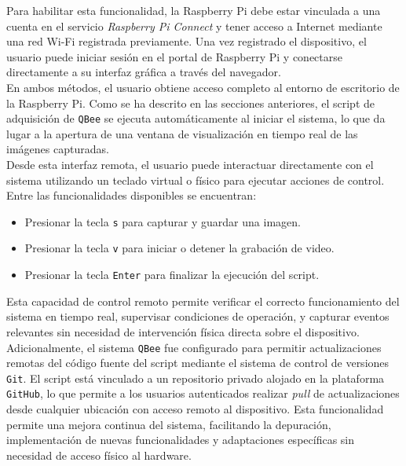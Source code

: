   Para habilitar esta funcionalidad, la Raspberry Pi debe estar vinculada a una cuenta en el servicio \textit{Raspberry Pi Connect} y tener acceso a Internet mediante una red Wi-Fi registrada previamente. Una vez registrado el dispositivo, el usuario puede iniciar sesión en el portal de Raspberry Pi y conectarse directamente a su interfaz gráfica a través del navegador.  \\
  
  
  En ambos métodos, el usuario obtiene acceso completo al entorno de escritorio de la Raspberry Pi. Como se ha descrito en las secciones anteriores, el script de adquisición de \texttt{QBee} se ejecuta automáticamente al iniciar el sistema, lo que da lugar a la apertura de una ventana de visualización en tiempo real de las imágenes capturadas.\\
  
  Desde esta interfaz remota, el usuario puede interactuar directamente con el sistema utilizando un teclado virtual o físico para ejecutar acciones de control. Entre las funcionalidades disponibles se encuentran:
  \begin{itemize}
      \item Presionar la tecla \texttt{s} para capturar y guardar una imagen.
      \item Presionar la tecla \texttt{v} para iniciar o detener la grabación de video.
      \item Presionar la tecla \texttt{Enter} para finalizar la ejecución del script.
  \end{itemize}
  
  Esta capacidad de control remoto permite verificar el correcto funcionamiento del sistema en tiempo real, supervisar condiciones de operación, y capturar eventos relevantes sin necesidad de intervención física directa sobre el dispositivo.\\
  
  
  Adicionalmente, el sistema \texttt{QBee} fue configurado para permitir actualizaciones remotas del código fuente del script mediante el sistema de control de versiones \texttt{Git}. El script está vinculado a un repositorio privado alojado en la plataforma \texttt{GitHub}, lo que permite a los usuarios autenticados realizar \textit{pull} de actualizaciones desde cualquier ubicación con acceso remoto al dispositivo. Esta funcionalidad permite una mejora continua del sistema, facilitando la depuración, implementación de nuevas funcionalidades y adaptaciones específicas sin necesidad de acceso físico al hardware.
  

